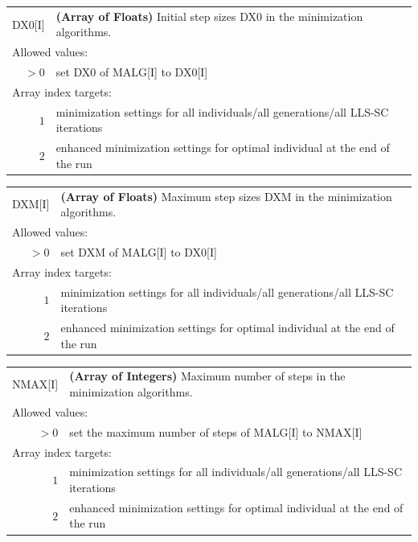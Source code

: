 \documentclass[10pt,a4paper,openany]{memoir}
\numberwithin{equation}{section}
\begin{document}
{
\begin{tabular}{r@{ : }l}
\label{descr:dx0}
       DX0[I]&\textbf{(Array of Floats)} Initial step sizes DX0 in the minimization algorithms.                                               \\ 
\multicolumn{2}{l}{Allowed values:} \\ 
    \(>0\)&set DX0 of MALG[I] to DX0[I]                                                                         \\ 
\multicolumn{2}{l}{Array index targets:} \\ 
     \(1\)&minimization settings for all individuals/all generations/all LLS-SC iterations \\
     \(2\)&enhanced minimization settings for optimal individual at the end of the run \\
\end{tabular}
\vspace{1ex}
}

{
\begin{tabular}{r@{ : }l}
\label{descr:dxm}
  DXM[I]&\textbf{(Array of Floats)} Maximum step sizes DXM in the minimization algorithms.                                               \\ 
\multicolumn{2}{l}{Allowed values:} \\ 
  \(>0\)&set DXM of MALG[I] to DX0[I]                                                                         \\ 
\multicolumn{2}{l}{Array index targets:} \\ 
     \(1\)&minimization settings for all individuals/all generations/all LLS-SC iterations \\
  \(2\)&enhanced minimization settings for optimal individual at the end of the run \\
\end{tabular}
\vspace{1ex}
}

{
\begin{tabular}{r@{ : }l}
\label{descr:nmax}
      NMAX[I]&\textbf{(Array of Integers)} Maximum number of steps in the minimization algorithms.                                              \\ 
\multicolumn{2}{l}{Allowed values:} \\ 
    \(>0\)&set the maximum number of steps of MALG[I] to NMAX[I]                                                \\ 
\multicolumn{2}{l}{Array index targets:} \\ 
     \(1\)&minimization settings for all individuals/all generations/all LLS-SC iterations \\
  \(2\)&enhanced minimization settings for optimal individual at the end of the run \\
\end{tabular}
\vspace{1ex}
}
\end{document}
